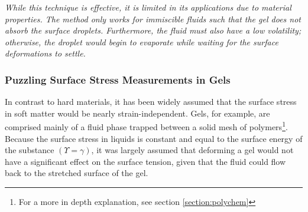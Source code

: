 \emph{While this technique is effective, it is limited in its applications due to material properties. The method only works for immiscible fluids such that the gel does not absorb the surface droplets. Furthermore, the fluid must also have a low volatility; otherwise, the droplet would begin to evaporate while waiting for the surface deformations to settle.}

\subsubsection{Puzzling Surface Stress Measurements in Gels}
In contrast to hard materials, it has been widely assumed that the surface stress in soft matter would be nearly strain-independent. Gels, for example, are comprised mainly of a fluid phase trapped between a solid mesh of polymers\footnote{For a more in depth explanation, see section \ref{section:polychem}}. Because the surface stress in liquids is constant and equal to the surface energy of the substance $(\Upsilon = \gamma)$, it was largely assumed that deforming a gel would not have a significant effect on the surface tension, given that the fluid could flow back to the stretched surface of the gel. 


